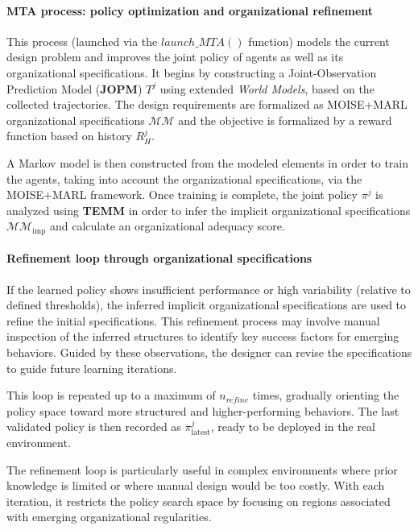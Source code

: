 \documentclass[pdflatex,sn-mathphys-num]{sn-jnl}%
\theoremstyle{thmstyleone}%
\theoremstyle{thmstyletwo}%
\theoremstyle{thmstylethree}%
\begin{document}
\paragraph*{MTA process: policy optimization and organizational refinement}

This process (launched via the $launch\_MTA()$ function) models the current design problem and improves the joint policy of agents as well as its organizational specifications. It begins by constructing a Joint-Observation Prediction Model (\textbf{JOPM}) $T^j$ using extended \textit{World Models}, based on the collected trajectories. The design requirements are formalized as MOISE+MARL organizational specifications $\mathcal{MM}$ and the objective is formalized by a reward function based on history $R^j_H$.

A Markov model is then constructed from the modeled elements in order to train the agents, taking into account the organizational specifications, via the MOISE+MARL framework. Once training is complete, the joint policy $\pi^j$ is analyzed using \textbf{TEMM} in order to infer the implicit organizational specifications $\mathcal{MM}_{\text{imp}}$ and calculate an organizational adequacy score.

\paragraph*{Refinement loop through organizational specifications}

If the learned policy shows insufficient performance or high variability (relative to defined thresholds), the inferred implicit organizational specifications are used to refine the initial specifications. This refinement process may involve manual inspection of the inferred structures to identify key success factors for emerging behaviors. Guided by these observations, the designer can revise the specifications to guide future learning iterations.

This loop is repeated up to a maximum of $n_{refine}$ times, gradually orienting the policy space toward more structured and higher-performing behaviors. The last validated policy is then recorded as $\pi^j_{\text {latest}}$, ready to be deployed in the real environment.

The refinement loop is particularly useful in complex environments where prior knowledge is limited or where manual design would be too costly. With each iteration, it restricts the policy search space by focusing on regions associated with emerging organizational regularities.
\end{document}

